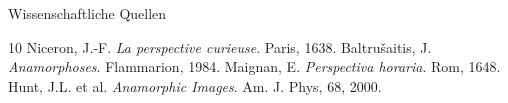 \documentclass[10pt, aspectratio=169]{beamer}
\begin{document}
\begin{frame}[allowframebreaks]{Wissenschaftliche Quellen}
    \begin{thebibliography}{10}
         Niceron, J.-F. \textit{La perspective curieuse}. Paris, 1638.
         Baltrušaitis, J. \textit{Anamorphoses}. Flammarion, 1984.
         Maignan, E. \textit{Perspectiva horaria}. Rom, 1648.
         Hunt, J.L. et al. \textit{Anamorphic Images}. Am. J. Phys, 68, 2000.
    \end{thebibliography}
\end{frame}
\end{document}
